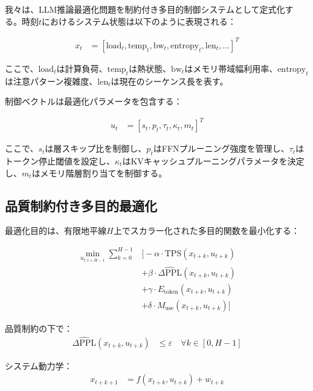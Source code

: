\documentclass[10pt,twocolumn,a4paper]{jarticle}
\newcommand{\ppl}{\mathrm{PPL}}
\begin{document}
我々は、LLM推論最適化問題を制約付き多目的制御システムとして定式化する。時刻$t$におけるシステム状態は以下のように表現される：

\begin{align}
x_t &= [\text{load}_t, \text{temp}_t, \text{bw}_t, \text{entropy}_t, \text{len}_t, \ldots]^T \label{eq:state}
\end{align}

ここで、$\text{load}_t$は計算負荷、$\text{temp}_t$は熱状態、$\text{bw}_t$はメモリ帯域幅利用率、$\text{entropy}_t$は注意パターン複雑度、$\text{len}_t$は現在のシーケンス長を表す。

制御ベクトルは最適化パラメータを包含する：

\begin{align}
u_t &= [s_t, p_t, \tau_t, \kappa_t, m_t]^T \label{eq:control}
\end{align}

ここで、$s_t$は層スキップ比を制御し、$p_t$はFFNプルーニング強度を管理し、$\tau_t$はトークン停止閾値を設定し、$\kappa_t$はKVキャッシュプルーニングパラメータを決定し、$m_t$はメモリ階層割り当てを制御する。

\subsection{品質制約付き多目的最適化}

最適化目的は、有限地平線$H$上でスカラー化された多目的関数を最小化する：

\begin{align}
\min_{u_{t:t+H-1}} \sum_{k=0}^{H-1} &\Big[ -\alpha \cdot \text{TPS}(x_{t+k}, u_{t+k}) \nonumber \\
&+ \beta \cdot \widehat{\Delta\ppl}(x_{t+k}, u_{t+k}) \nonumber \\
&+ \gamma \cdot E_{\text{token}}(x_{t+k}, u_{t+k}) \nonumber \\
&+ \delta \cdot M_{\text{use}}(x_{t+k}, u_{t+k}) \Big] \label{eq:objective}
\end{align}

品質制約の下で：
\begin{align}
\widehat{\Delta\ppl}(x_{t+k}, u_{t+k}) &\leq \varepsilon \quad \forall k \in [0, H-1] \label{eq:quality_constraint}
\end{align}

システム動力学：
\begin{align}
x_{t+k+1} &= f(x_{t+k}, u_{t+k}) + w_{t+k} \label{eq:dynamics}
\end{align}
\end{document}
